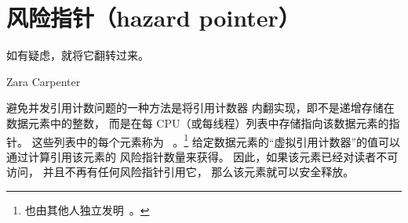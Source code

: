 
\section{风险指针（hazard pointer）}
\label{sec:defer:Hazard Pointers}
%
\epigraph{如有疑虑，就将它翻转过来。}{Zara Carpenter}

避免并发引用计数问题的一种方法是将引用计数器
内翻实现，即不是递增存储在数据元素中的整数，
而是在每 CPU（或每线程）列表中存储指向该数据元素的指针。
这些列表中的每个元素称为
\emph{}~\cite{MagedMichael04a}。\footnote{
	也由其他人独立发明~\cite{HerlihyLM02}。}
给定数据元素的``虚拟引用计数器''的值可以通过计算引用该元素的
风险指针数量来获得。
因此，如果该元素已经对读者不可访问，
并且不再有任何风险指针引用它，
那么该元素就可以安全释放。

\begin{listing}

\caption{风险指针记录和清除}
\label{lst:defer:Hazard-Pointer Recording and Clearing}
\end{listing}

